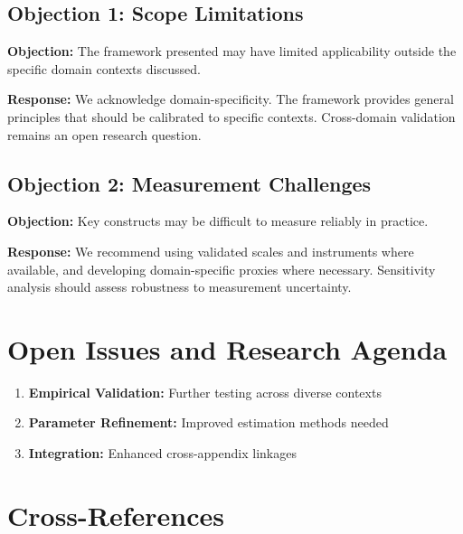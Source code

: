 \subsection{Objection 1: Scope Limitations}

\textbf{Objection:} The framework presented may have limited applicability
outside the specific domain contexts discussed.

\textbf{Response:} We acknowledge domain-specificity. The framework provides
general principles that should be calibrated to specific contexts. Cross-domain
validation remains an open research question.

\subsection{Objection 2: Measurement Challenges}

\textbf{Objection:} Key constructs may be difficult to measure reliably in
practice.

\textbf{Response:} We recommend using validated scales and instruments where
available, and developing domain-specific proxies where necessary. Sensitivity
analysis should assess robustness to measurement uncertainty.



\section{Open Issues and Research Agenda}
\label{sec:gtc-open}

\begin{enumerate}
    \item \textbf{Empirical Validation:} Further testing across diverse contexts
    \item \textbf{Parameter Refinement:} Improved estimation methods needed
    \item \textbf{Integration:} Enhanced cross-appendix linkages
\end{enumerate}

\section{Cross-References}

\nocite{bcm_master}

\label{sec:gtc-crossref}

